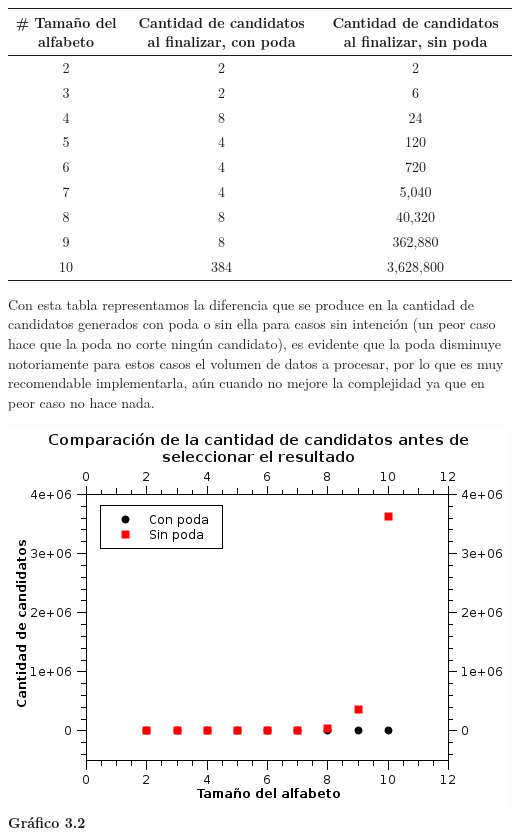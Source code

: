 \documentclass[a4paper, 10pt]{article}
\begin{document}
\begin{center}
\begin{tabular}{|c|c|c|}
\hline
\# Tamaño del alfabeto & Cantidad de candidatos al finalizar, con poda & Cantidad de candidatos al finalizar, sin poda\\
\hline
2 & 2 & 2\\
\hline
3 & 2 & 6\\
\hline
4 & 8 & 24\\
\hline
5 & 4 & 120\\
\hline
6 & 4 & 720\\
\hline
7 & 4 & 5,040\\
\hline
8 & 8 & 40,320\\
\hline
9 & 8 & 362,880\\
\hline
10 & 384 & 3,628,800\\
\hline


\end{tabular}
\end{center} \vspace{0,15cm}

Con esta tabla representamos la diferencia que se produce en la cantidad de candidatos generados con poda o sin ella para casos sin intención (un peor caso hace que la poda no corte ningún candidato), es evidente que la poda disminuye notoriamente para estos casos el volumen de datos a procesar, por lo que es muy recomendable implementarla, aún cuando no mejore la complejidad ya que en peor caso no hace nada.

\begin{center}
\includegraphics[scale=0.80]{graficos/3-ejG2.png} \\
\scriptsize{\textsf{\textbf{Gr\'afico 3.2}}}  \\
\end{center}
\end{document}
